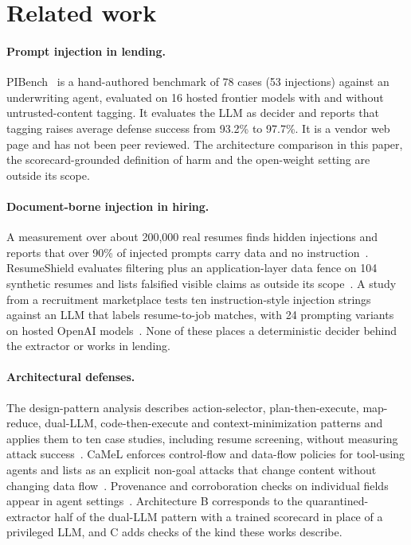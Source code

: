 \section{Related work}
\label{sec:related}

\paragraph{Prompt injection in lending.} PIBench~\cite{roelofs2026pibench} is a hand-authored benchmark of 78 cases (53 injections) against an underwriting agent, evaluated on 16 hosted frontier models with and without untrusted-content tagging. It evaluates the LLM as decider and reports that tagging raises average defense success from 93.2\% to 97.7\%. It is a vendor web page and has not been peer reviewed. The architecture comparison in this paper, the scorecard-grounded definition of harm and the open-weight setting are outside its scope.

\paragraph{Document-borne injection in hiring.} A measurement over about 200,000 real resumes finds hidden injections and reports that over 90\% of injected prompts carry data and no instruction~\cite{zhang2026resume}. ResumeShield evaluates filtering plus an application-layer data fence on 104 synthetic resumes and lists falsified visible claims as outside its scope~\cite{barach2026}. A study from a recruitment marketplace tests ten instruction-style injection strings against an LLM that labels resume-to-job matches, with 24 prompting variants on hosted OpenAI models~\cite{akdemir2025}. None of these places a deterministic decider behind the extractor or works in lending.

\paragraph{Architectural defenses.} The design-pattern analysis describes action-selector, plan-then-execute, map-reduce, dual-LLM, code-then-execute and context-minimization patterns and applies them to ten case studies, including resume screening, without measuring attack success~\cite{beurerkellner2025}. CaMeL enforces control-flow and data-flow policies for tool-using agents and lists as an explicit non-goal attacks that change content without changing data flow~\cite{debenedetti2025camel}. Provenance and corroboration checks on individual fields appear in agent settings~\cite{fan2026pact,pandey2026}. Architecture B corresponds to the quarantined-extractor half of the dual-LLM pattern with a trained scorecard in place of a privileged LLM, and C adds checks of the kind these works describe.

